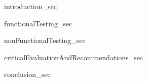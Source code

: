 {introduction_sec}

{functionalTesting_sec}

{nonFunctionalTesting_sec}

{criticalEvaluationAndRecommendations_sec}

{conclusion_sec}

